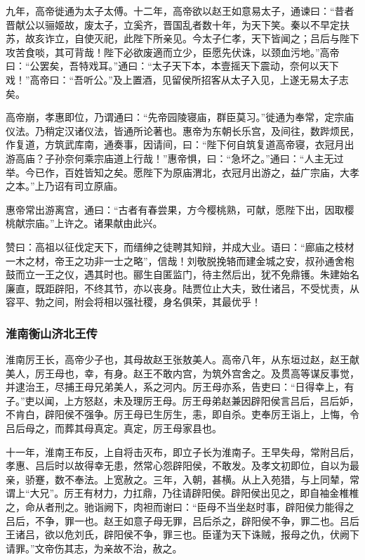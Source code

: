\documentclass[]{article}
\begin{document}
九年，高帝徙通为太子太傅。十二年，高帝欲以赵王如意易太子，通谏曰：``昔者晋献公以骊姬故，废太子，立奚齐，晋国乱者数十年，为天下笑。秦以不早定扶苏，故亥诈立，自使灭祀，此陛下所亲见。今太子仁孝，天下皆闻之；吕后与陛下攻苦食啖，其可背哉！陛下必欲废適而立少，臣愿先伏诛，以颈血污地。''高帝曰：``公罢矣，吾特戏耳。''通曰：``太子天下本，本壹摇天下震动，奈何以天下戏！''高帝曰：``吾听公。''及上置酒，见留侯所招客从太子入见，上遂无易太子志矣。

高帝崩，孝惠即位，乃谓通曰：``先帝园陵寝庙，群臣莫习。''徙通为奉常，定宗庙仪法。乃稍定汉诸仪法，皆通所论著也。惠帝为东朝长乐宫，及间往，数跸烦民，作复道，方筑武库南，通奏事，因请间，曰：``陛下何自筑复道高帝寝，衣冠月出游高庙？子孙奈何乘宗庙道上行哉！''惠帝惧，曰：``急坏之。''通曰：``人主无过举。今已作，百姓皆知之矣。愿陛下为原庙渭北，衣冠月出游之，益广宗庙，大孝之本。''上乃诏有司立原庙。

惠帝常出游离宫，通曰：``古者有春尝果，方今樱桃熟，可献，愿陛下出，因取樱桃献宗庙。''上许之。诸果献由此兴。

赞曰：高祖以征伐定天下，而缙绅之徒聘其知辩，并成大业。语曰：``廊庙之枝材一木之材，帝王之功非一士之略''，信哉！刘敬脱挽辂而建金城之安，叔孙通舍枹鼓而立一王之仪，遇其时也。郦生自匿监门，待主然后出，犹不免鼎镬。朱建始名廉直，既距辟阳，不终其节，亦以丧身。陆贾位止大夫，致仕诸吕，不受忧责，从容平、勃之间，附会将相以强社稷，身名俱荣，其最优乎！

\hypertarget{header-n3956}{%
\subsubsection{淮南衡山济北王传}\label{header-n3956}}

淮南厉王长，高帝少子也，其母故赵王张敖美人。高帝八年，从东垣过赵，赵王献美人，厉王母也，幸，有身。赵王不敢内宫，为筑外宫舍之。及贯高等谋反事觉，并逮治王，尽捕王母兄弟美人，系之河内。厉王母亦系，告吏曰：``日得幸上，有子。''吏以闻，上方怒赵，未及理厉王母。厉王母弟赵兼因辟阳侯言吕后，吕后妒，不肯白，辟阳侯不强争。厉王母已生厉生，恚，即自杀。吏奉厉王诣上，上悔，令吕后母之，而葬其母真定。真定，厉王母家县也。

十一年，淮南王布反，上自将击灭布，即立子长为淮南子。王早失母，常附吕后，孝惠、吕后时以故得幸无患，然常心怨辟阳侯，不敢发。及孝文初即位，自以为最亲，骄蹇，数不奉法。上宽赦之。三年，入朝，甚横。从上入苑猎，与上同辇，常谓上``大兄''。厉王有材力，力扛鼎，乃往请辟阳侯。辟阳侯出见之，即自袖金椎椎之，命从者刑之。驰诣阙下，肉袒而谢曰：``臣母不当坐赵时事，辟阳侯力能得之吕后，不争，罪一也。赵王如意子母无罪，吕后杀之，辟阳侯不争，罪二也。吕后王诸吕，欲以危刘氏，辟阳侯不争，罪三也。臣谨为天下诛贼，报母之仇，伏阙下请罪。''文帝伤其志，为亲故不治，赦之。
\end{document}
